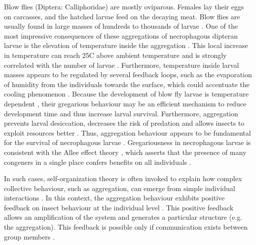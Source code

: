 Blow flies (Diptera: Calliphoridae) are mostly oviparous. Females lay their eggs on carcasses, and the hatched larvae feed on the decaying meat. Blow flies are usually found in large masses of hundreds to thousands of larvae \citep{ives_aggregation_1991,slone_thermoregulation_2007}. One of the most impressive consequences of these aggregations of necrophagous dipteran larvae is the elevation of temperature inside the aggregation \citep{slone_thermoregulation_2007, charabidze_larval-mass_2011}. This local increase in temperature can reach 25C above ambient temperature and is strongly correlated with the number of larvae \citep{charabidze_larval-mass_2011}. Furthermore, temperature inside larval masses appears to be regulated by several feedback loops, such as the evaporation of humidity from the individuals towards the surface, which could accentuate the cooling phenomenon \citep{slone_thermoregulation_2007, nelson_thermal_2009, rivers_physiological_2011}. Because the development of blow fly larvae is temperature dependent \citep{huckesfeld_feel_2011}, their gregarious behaviour may be an efficient mechanism to reduce development time and thus increase larval survival. Furthermore, aggregation prevents larval desiccation, decreases the risk of predation \citep{putman_dynamics_1977} and allows insects to exploit resources better \citep{hobson_studies_1932}. Thus, aggregation behaviour appears to be fundamental for the survival of necrophagous larvae \citep{slone_thermoregulation_2007, nelson_thermal_2009}. Gregariousness in necrophagous larvae is consistent with the Allee effect theory \citep{stephens_consequences_1999}, which asserts that the presence of many congeners in a single place confers benefits on all individuals \citep{stephens_consequences_1999, etienne_interaction_2002, woodcock_aggregation_2002, allen_group_2010}.

In such cases, self-organization theory is often invoked to explain how complex collective behaviour, such as aggregation, can emerge from simple individual interactions \citep{deneubourg_collective_1989,bonabeau_self-organization_1997,bonabeau_auto-organisation_1997,camazine_self-organization_2001,sumpter_collective_2009}. In this context, the aggregation behaviour exhibits positive feedback on insect behaviour at the individual level \citep{bonabeau_auto-organisation_1997}. This positive feedback allows an amplification of the system and generates a particular structure (e.g. the aggregation). This feedback is possible only if communication exists between group members \citep{deneubourg_dynamics_2002}.

